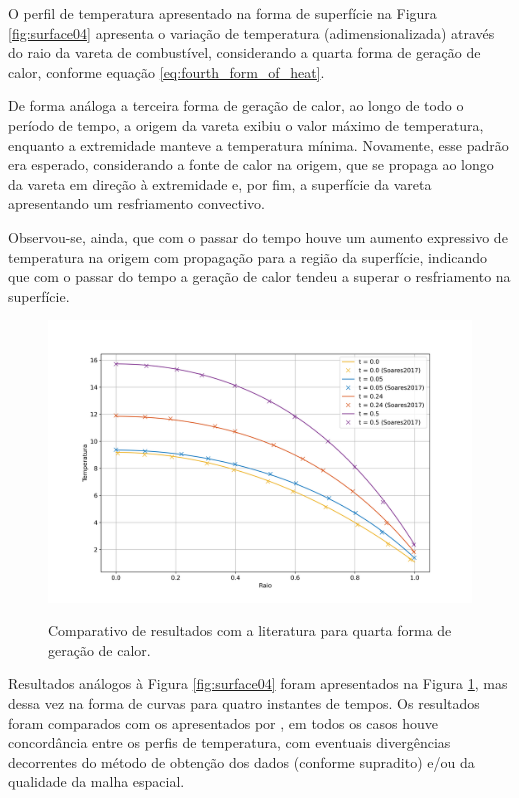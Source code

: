 O perfil de temperatura apresentado na forma de superfície na Figura \ref{fig:surface04} apresenta o variação de temperatura (adimensionalizada) através do raio da vareta de combustível, considerando a quarta forma de geração de calor, conforme equação \ref{eq:fourth_form_of_heat}.

De forma análoga a terceira forma de geração de calor, ao longo de todo o período de tempo, a origem da vareta exibiu o valor máximo de temperatura, enquanto a extremidade manteve a temperatura mínima. Novamente, esse padrão era esperado, considerando a fonte de calor na origem, que se propaga ao longo da vareta em direção à extremidade e, por fim, a superfície da vareta apresentando um resfriamento convectivo.

Observou-se, ainda, que com o passar do tempo houve um aumento expressivo de temperatura na origem com propagação para a região da superfície, indicando que com o passar do tempo a geração de calor tendeu a superar o resfriamento na superfície.

\begin{figure}[H]
    \centering
    \caption{Comparativo de resultados com a literatura para quarta forma de geração de calor.}
    \includegraphics[scale=0.5]{figures/results/Fig14.png}
    \label{fig:profile04}
\end{figure}

Resultados análogos à Figura \ref{fig:surface04} foram apresentados na Figura \ref{fig:profile04}, mas dessa vez na forma de curvas para quatro instantes de tempos. Os resultados foram comparados com os apresentados por \citet{soares2017}, em todos os casos houve concordância entre os perfis de temperatura, com eventuais divergências decorrentes do método de obtenção dos dados (conforme supradito) e/ou da qualidade da malha espacial.

